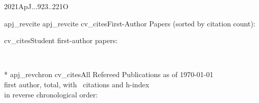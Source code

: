 \documentclass{article}
\begin{document}
\nocite{bibb}{2021ApJ...923..221O}

{apj_revcite}
{apj_revcite}
%
%
{cv_cites}{First-Author Papers (sorted by citation count):}
%


{cv_cites}{Student first-author papers:}

\vfill  
\nopagebreak

\newpage

\nocite{bibc}{*}
{apj_revchron}
{cv_cites}{All Refereed Publications as of \today\\
\nfirst first author, \nrefereed total, with \ncitestotal\ citations and h-index \hindex\\
in reverse chronological order:}
%




\end{document}
